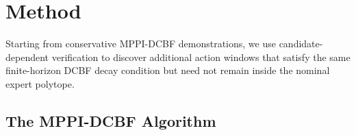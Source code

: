 \documentclass[letterpaper, 10 pt, conference]{ieeeconf}
\begin{document}
\section{Method}

Starting from conservative MPPI-DCBF demonstrations, we use candidate-dependent verification to discover additional action windows that satisfy the same finite-horizon DCBF decay condition but need not remain inside the nominal expert polytope.

\subsection{The MPPI-DCBF Algorithm}
\end{document}
